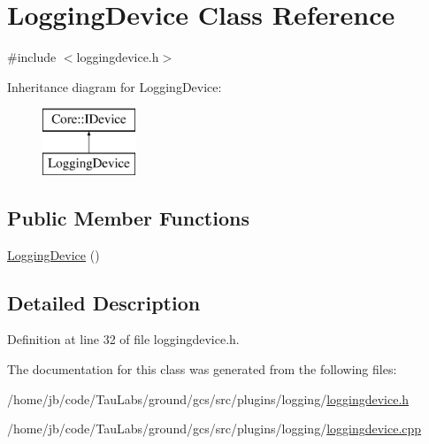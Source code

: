 \hypertarget{class_logging_device}{\section{\-Logging\-Device \-Class \-Reference}
\label{class_logging_device}
}


{\ttfamily \#include $<$loggingdevice.\-h$>$}

\-Inheritance diagram for \-Logging\-Device\-:\begin{figure}[H]
\begin{center}
\leavevmode
\includegraphics[height=2.000000cm]{class_logging_device}
\end{center}
\end{figure}
\subsection*{\-Public \-Member \-Functions}
\begin{DoxyCompactItemize}
\item 
\hyperlink{group___core_plugin_gaba24d30b517c7a1f35721b04eb1cc90b}{\-Logging\-Device} ()
\end{DoxyCompactItemize}


\subsection{\-Detailed \-Description}


\-Definition at line 32 of file loggingdevice.\-h.



\-The documentation for this class was generated from the following files\-:\begin{DoxyCompactItemize}
\item 
/home/jb/code/\-Tau\-Labs/ground/gcs/src/plugins/logging/\hyperlink{loggingdevice_8h}{loggingdevice.\-h}\item 
/home/jb/code/\-Tau\-Labs/ground/gcs/src/plugins/logging/\hyperlink{loggingdevice_8cpp}{loggingdevice.\-cpp}\end{DoxyCompactItemize}
